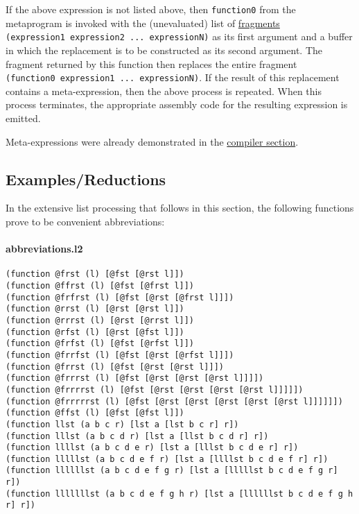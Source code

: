 \documentclass[]{article}
\let\oldparagraph\paragraph
\renewcommand{\paragraph}[1]{\oldparagraph{#1}\mbox{}}
\begin{document}
If the above expression is not listed above, then \texttt{function0}
from the metaprogram is invoked with the (unevaluated) list of
\protect\hyperlink{internal-representation}{fragments}
\texttt{(expression1\ expression2\ ...\ expressionN)} as its first
argument and a buffer in which the replacement is to be constructed as
its second argument. The fragment returned by this function then
replaces the entire fragment
\texttt{(function0\ expression1\ ...\ expressionN)}. If the result of
this replacement contains a meta-expression, then the above process is
repeated. When this process terminates, the appropriate assembly code
for the resulting expression is emitted.

Meta-expressions were already demonstrated in the
\protect\hyperlink{the-compiler}{compiler section}.

\hypertarget{examplesreductions}{\subsection{Examples/Reductions}\label{examplesreductions}}

In the extensive list processing that follows in this section, the
following functions prove to be convenient abbreviations:

\paragraph{abbreviations.l2}\label{abbreviations.l2}

\begin{verbatim}
(function @frst (l) [@fst [@rst l]])
(function @ffrst (l) [@fst [@frst l]])
(function @frfrst (l) [@fst [@rst [@frst l]]])
(function @rrst (l) [@rst [@rst l]])
(function @rrrst (l) [@rst [@rrst l]])
(function @rfst (l) [@rst [@fst l]])
(function @frfst (l) [@fst [@rfst l]])
(function @frrfst (l) [@fst [@rst [@rfst l]]])
(function @frrst (l) [@fst [@rst [@rst l]]])
(function @frrrst (l) [@fst [@rst [@rst [@rst l]]]])
(function @frrrrst (l) [@fst [@rst [@rst [@rst [@rst l]]]]])
(function @frrrrrst (l) [@fst [@rst [@rst [@rst [@rst [@rst l]]]]]])
(function @ffst (l) [@fst [@fst l]])
(function llst (a b c r) [lst a [lst b c r] r])
(function lllst (a b c d r) [lst a [llst b c d r] r])
(function llllst (a b c d e r) [lst a [lllst b c d e r] r])
(function lllllst (a b c d e f r) [lst a [llllst b c d e f r] r])
(function llllllst (a b c d e f g r) [lst a [lllllst b c d e f g r] r])
(function lllllllst (a b c d e f g h r) [lst a [llllllst b c d e f g h r] r])
\end{verbatim}
\end{document}
